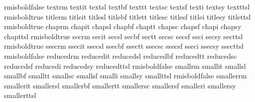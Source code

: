 {{%

%
%
%
%

\def\assignfonts#1{%
  \expandafter\let\expandafter\rmfont\csname #1rm\endcsname
  \expandafter\let\expandafter\itfont\csname #1it\endcsname
  \expandafter\let\expandafter\slfont\csname #1sl\endcsname
  \expandafter\let\expandafter\bffont\csname #1bf\endcsname
  \expandafter\let\expandafter\ttfont\csname #1tt\endcsname
  \expandafter\let\expandafter\smallcaps\csname #1sc\endcsname
  \expandafter\let\expandafter\sffont  \csname #1sf\endcsname
  \expandafter\let\expandafter\ifont   \csname #1i\endcsname
  \expandafter\let\expandafter\syfont  \csname #1sy\endcsname
  \expandafter\let\expandafter\ttslfont\csname #1ttsl\endcsname
}

\newif\ifrmisbold

\def\switchtolllsize{%
   \expandafter\assignfonts\expandafter{\lllsize}%
   \ifrmisbold
     \let\rmfont\bffont
   \fi
   \csname\curfontstyle\endcsname
}%

\def\switchtolsize{%
   \expandafter\assignfonts\expandafter{\lsize}%
   \ifrmisbold
     \let\rmfont\bffont
   \fi
   \csname\curfontstyle\endcsname
}%

\def\definefontsetatsize#1#2#3#4#5{%
\expandafter\def\csname #1fonts\endcsname{%
  \def\curfontsize{#1}%
  \def\lsize{#2}\def\lllsize{#3}%
  \csname rmisbold#5\endcsname
  \assignfonts{#1}%
  \resetmathfonts
  \setleading{#4}%
}}

\definefontsetatsize{text}   {reduced}{smaller}{\textleading}{false}
\definefontsetatsize{title}  {chap}   {subsec} {27pt}  {true}
\definefontsetatsize{chap}   {sec}    {text}   {19pt}  {true}
\definefontsetatsize{sec}    {subsec} {reduced}{17pt}  {true}
\definefontsetatsize{ssec}   {text}   {small}  {15pt}  {true}
\definefontsetatsize{reduced}{small}  {smaller}{10.5pt}{false}
\definefontsetatsize{small}  {smaller}{smaller}{10.5pt}{false}
\definefontsetatsize{smaller}{smaller}{smaller}{9.5pt} {false}

}}
